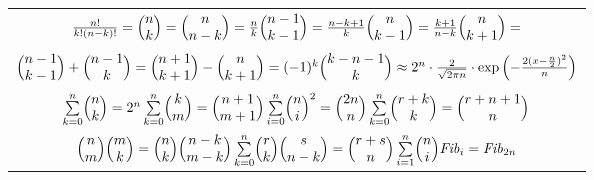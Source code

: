 \begin{expandtable}
\begin{tabularx}{\linewidth}{|C|}
	\hline
	$\frac{n!}{k!(n - k)!} \hfill=\hfill
	\binom{n}{k} \hfill=\hfill
	\binom{n}{n - k} \hfill=\hfill
	\frac{n}{k}\binom{n - 1}{k - 1} \hfill=\hfill
	\frac{n-k+1}{k}\binom{n}{k - 1} \hfill=\hfill
	\frac{k+1}{n-k}\binom{n}{k + 1} \hfill=\hfill$\\
	
	$\binom{n - 1}{k - 1} + \binom{n - 1}{k} \hfill=\hfill
	\binom{n + 1}{k + 1} - \binom{n}{k + 1} \hfill=\hfill
	(-1)^k \binom{k - n - 1}{k} \hfill\approx\hfill
	2^{n} \cdot \frac{2}{\sqrt{2\pi n}}\cdot\exp\left(-\frac{2(x - \frac{n}{2})^2}{n}\right)$\\
	\grayhline
	
	$\sum\limits_{k = 0}^n \binom{n}{k} = 2^n\hfill
	\sum\limits_{k = 0}^n \binom{k}{m} = \binom{n + 1}{m + 1}\hfill
	\sum\limits_{i = 0}^n \binom{n}{i}^2 = \binom{2n}{n}\hfill
	\sum\limits_{k = 0}^n\binom{r + k}{k} = \binom{r + n + 1}{n}$\\
	
	$\binom{n}{m}\binom{m}{k} = \binom{n}{k}\binom{n - k}{m - k}\hfill
	\sum\limits_{k = 0}^n \binom{r}{k}\binom{s}{n - k} = \binom{r + s}{n}\hfill
	\sum\limits_{i = 1}^n \binom{n}{i} \mathit{Fib}_i = \mathit{Fib}_{2n}$\\
	\hline
\end{tabularx}
\end{expandtable}
